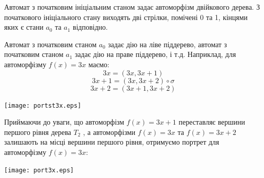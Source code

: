 \documentclass[a4paper,12pt]{article} \usepackage{a4wide}
\numberwithin{equation}{subsection}
\begin{document}
 Автомат з початковим ініціальним станом задає автоморфізм двійкового дерева. З початкового ініціального стану виходять дві
стрілки, помічені 0 та 1, кінцями яких є стани $a_0$ та $a_1$ відповідно.

Автомат з початковим станом $a_0$ задає дію на ліве піддерево, автомат з початковим станом $a_1$ задає дію на праве піддерево, і т.д.
Наприклад, для автоморфізму $f(x)=3x$ маємо:
$$3x=(3x,3x+1)$$
$$3x+1=(3x,3x+2)\circ\sigma$$
$$3x+2=(3x+1,3x+2)$$
\begin{center}
\texttt{[image: portst3x.eps]}
\end{center}

Приймаючи до уваги, що автоморфізм $f(x)=3x+1$ переставляє вершини першого рівня дерева $T_2$ ,
 а автоморфізми $f(x)=3x$ та $f(x)=3x+2$ залишають на місці вершини першого рівня,
отримуємо портрет для автоморфізму $f(x)=3x$:

\begin{center}
\texttt{[image: port3x.eps]}
\end{center}
\end{document}
